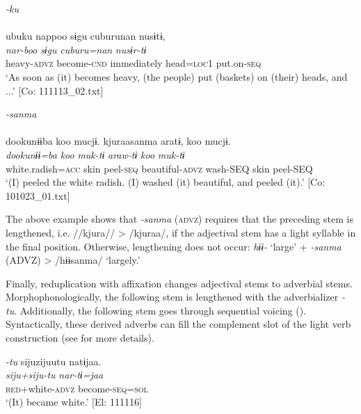 \ea  \label{ex:4.61} \ea  \textit{{}-ku} \label{ex:4.61a}\\\\
    \glll     ubuku  nappoo  sɨgu  cuburunan  nusɨtɨ,\\
      \textit{}  \textit{nar-boo}  \textit{sɨgu}  \textit{cuburu=nan}  \textit{nusɨr-tɨ}\\
      heavy-\textsc{advz}  become-\textsc{cnd}  immediately  head=\textsc{loc}1  put.on-\textsc{seq}\\
      \glt       ‘As soon as (it) becomes heavy, (the people) put (baskets) on (their) heads, and ...’ [Co: 111113\_02.txt]

\ex  \textit{{}-sanma}\\\\
\glll dookunɨɨba  koo  mucjɨ.  kjuraasanma  aratɨ,   koo  mucjɨ.\\
      \textit{dookunɨɨ=ba}  \textit{koo}  \textit{muk-tɨ}  \textit{}  \textit{araw-tɨ}  \textit{koo}  \textit{muk-tɨ}\\                                                                                                  
      white.radish=\textsc{acc}  skin  peel-\textsc{seq}  beautiful-\textsc{advz}  wash-SEQ                                   skin  peel-SEQ\\
      \glt       ‘(I) peeled the white radish. (I) washed (it) beautiful, and peeled (it).’     [Co: 101023\_01.txt]
    \z
\z

The above example shows that \textit{{}-sanma} (\textsc{advz}) requires that the preceding stem is lengthened, i.e. //kjura// > /kjuraa/, if the adjectival stem has a light syllable in the final position. Otherwise, lengthening does not occur: \textit{hɨɨ-} ‘large’ + \textit{{}-sanma} (ADVZ) > /hɨɨsanma/ ‘largely.’

  Finally, reduplication with affixation changes adjectival stems to adverbial stems. Morphophonologically, the following stem is lengthened with the adverbializer \textit{{}-tu}. Additionally, the following stem goes through sequential voicing (). Syntactically, these derived adverbs can fill the complement slot of the light verb construction (see  for more details).

\ea  \textit{{}-tu} \label{ex:4.62}
\glll   sijuzijuutu  natɨjaa.\\
    \textit{siju+siju-tu}  \textit{nar-tɨ=jaa}\\
    \textsc{red}+white-\textsc{advz}  become-\textsc{seq}=\textsc{sol}\\
    \glt     ‘(It) became white.’ [El: 111116]
\z

